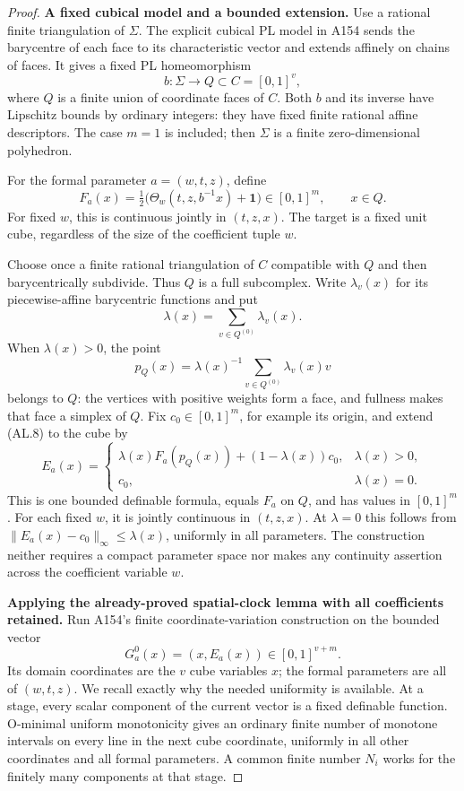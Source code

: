 \begin{proof}
\textbf{A fixed cubical model and a bounded extension.}\quad
Use a rational finite triangulation of $\Sigma$. The explicit cubical
PL model in A154 sends the barycentre of each face to its characteristic
vector and extends affinely on chains of faces. It gives a fixed PL
homeomorphism
\[
 b:\Sigma\longrightarrow Q\subset C=[0,1]^v,
\]
where $Q$ is a finite union of coordinate faces of $C$. Both $b$ and its
inverse have Lipschitz bounds by ordinary integers: they have fixed
finite rational affine descriptors. The case $m=1$ is included; then
$\Sigma$ is a finite zero-dimensional polyhedron.

For the formal parameter $a=(w,t,z)$, define
\[
 F_a(x)=\tfrac12\bigl(\Theta_w(t,z,b^{-1}x)+\mathbf1\bigr)
       \in[0,1]^m,\qquad x\in Q.
 \tag{AL.8}
\]
For fixed $w$, this is continuous jointly in $(t,z,x)$. The target is a
fixed unit cube, regardless of the size of the coefficient tuple $w$.

Choose once a finite rational triangulation of $C$ compatible with $Q$
and then barycentrically subdivide. Thus $Q$ is a full subcomplex.
Write $\lambda_v(x)$ for its piecewise-affine barycentric functions and
put
\[
 \lambda(x)=\sum_{v\in Q^{(0)}}\lambda_v(x).
\]
When $\lambda(x)>0$, the point
\[
 p_Q(x)=\lambda(x)^{-1}
          \sum_{v\in Q^{(0)}}\lambda_v(x)v
\]
belongs to $Q$: the vertices with positive weights form a face, and
fullness makes that face a simplex of $Q$. Fix $c_0\in[0,1]^m$, for
example its origin, and extend (AL.8) to the cube by
\[
 E_a(x)=
 \begin{cases}
 \lambda(x)F_a(p_Q(x))+(1-\lambda(x))c_0,&\lambda(x)>0,\\
 c_0,&\lambda(x)=0.
 \end{cases}
 \tag{AL.9}
\]
This is one bounded definable formula, equals $F_a$ on $Q$, and has
values in $[0,1]^m$. For each fixed $w$, it is jointly continuous in
$(t,z,x)$. At $\lambda=0$ this follows from
$\|E_a(x)-c_0\|_\infty\le\lambda(x)$, uniformly in all parameters.
The construction neither requires a compact parameter space nor makes
any continuity assertion across the coefficient variable $w$.

\textbf{Applying the already-proved spatial-clock lemma with all coefficients retained.}\quad
Run A154's finite coordinate-variation construction on the bounded vector
\[
 G^0_a(x)=(x,E_a(x))\in[0,1]^{v+m}.
 \tag{AL.10}
\]
Its domain coordinates are the $v$ cube variables $x$; the formal
parameters are all of $(w,t,z)$. We recall exactly why the needed
uniformity is available. At a stage, every scalar component of the
current vector is a fixed definable function. O-minimal uniform
monotonicity gives an ordinary finite number of monotone intervals on
every line in the next cube coordinate, uniformly in all other
coordinates and all formal parameters. A common finite number $N_i$
works for the finitely many components at that stage.


\end{proof}
